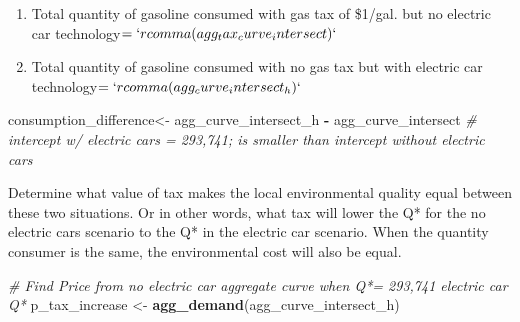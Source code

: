 \documentclass[]{article}
\newenvironment{Shaded}{\begin{snugshade}}{\end{snugshade}}
\newcommand{\CommentTok}[1]{\textcolor[rgb]{0.56,0.35,0.01}{\textit{#1}}}
\newcommand{\KeywordTok}[1]{\textcolor[rgb]{0.13,0.29,0.53}{\textbf{#1}}}
\newcommand{\NormalTok}[1]{#1}
\newcommand{\OperatorTok}[1]{\textcolor[rgb]{0.81,0.36,0.00}{\textbf{#1}}}
\newcommand{\StringTok}[1]{\textcolor[rgb]{0.31,0.60,0.02}{#1}}
\begin{document}
\begin{enumerate}
\def\labelenumi{\alph{enumi}.}
\item
  Total quantity of gasoline consumed with gas tax of \$1/gal. but no
  electric car technology\(=`rcomma(agg_tax_curve_intersect)`\)
\item
  Total quantity of gasoline consumed with no gas tax but with electric
  car technology\(=`rcomma(agg_curve_intersect_h)`\)
\end{enumerate}

\begin{Shaded}
\begin{Highlighting}[]
\NormalTok{consumption_difference<-}\StringTok{ }\NormalTok{agg_curve_intersect_h }\OperatorTok{-}\StringTok{ }\NormalTok{agg_curve_intersect}
\CommentTok{# intercept w/ electric cars = 293,741; is smaller than intercept without electric cars}
\end{Highlighting}
\end{Shaded}

Determine what value of tax makes the local environmental quality equal
between these two situations. Or in other words, what tax will lower the
Q* for the no electric cars scenario to the Q* in the electric car
scenario. When the quantity consumer is the same, the environmental cost
will also be equal.

\begin{Shaded}
\begin{Highlighting}[]
\CommentTok{# Find Price from no electric car aggregate curve when Q*= 293,741 electric car Q*}
\NormalTok{p_tax_increase <-}\StringTok{ }\KeywordTok{agg_demand}\NormalTok{(agg_curve_intersect_h) }
\end{Highlighting}
\end{Shaded}
\end{document}
